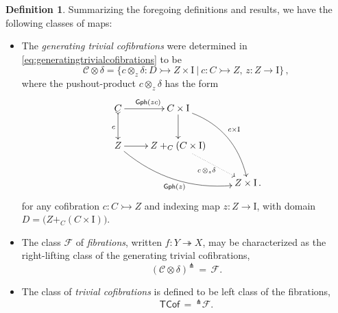 \documentclass[12pt]{article}
\newcommand{\mono}{\ensuremath{\rightarrowtail}}
\newcommand{\ra}{\ensuremath{\rightarrow}}
\newcommand{\onto}{\ensuremath{\twoheadrightarrow}}
\newcommand{\I}{\ensuremath{\mathrm{I}}}
\theoremstyle{remark}
\theoremstyle{definition}
\newtheorem{definition}[theorem]{Definition}
\begin{document}
\begin{definition}\label{def:FibWFSclasses}
Summarizing the foregoing definitions and results, we have the following classes of maps:

%
%

\begin{itemize}
\item  The \emph{generating trivial cofibrations} were determined in \eqref{eq:generatingtrivialcofibrations} to be
\begin{equation}\label{eq:genunbiasedTCof}
\mathcal{C}\otimes\delta = \{c \otimes_z \delta : D \mono Z\times\I\ |\  c : C\mono Z,\, z : Z \ra \I\}\,,
\end{equation}
where the pushout-product $c\otimes_z \delta$ has the form
\begin{equation}\label{diagram:unbiasedbasicpushoutproduct2}
\xymatrix{
C \ar@{>->}[d]_{c} \ar[r]^{\mathsf{Gph}(zc)} & C\times \I \ar[d] \ar@/^4ex/ [rdd]^{c\times\I}\\
Z \ar@/_4ex/ [rrd]_{\mathsf{Gph}(z)} \ar[r] &  Z +_C (C\times\I) \ar@{.>}[rd]_{c\, \otimes_z \delta} \\
&& Z\times\I\,.
}
\end{equation}
for any cofibration $c : C\mono Z$ and indexing map $z : Z \ra \I$, with domain $D = \big(Z +_C (C\times\I)\big)$.

\item The class $\mathcal{F}$ of \emph{fibrations}, written $f : Y\onto X$, may be characterized as the right-lifting class of the generating trivial cofibrations,
\[
(\mathcal{C}\otimes\delta)^\pitchfork\, =\,\mathcal{F}.
\]

\item The class of \emph{trivial cofibrations} is defined to be left class of the fibrations,
\[
\mathsf{TCof}\, =\, ^{\pitchfork}\mathcal{F}.
\]
\end{itemize}
\end{definition}
\end{document}
